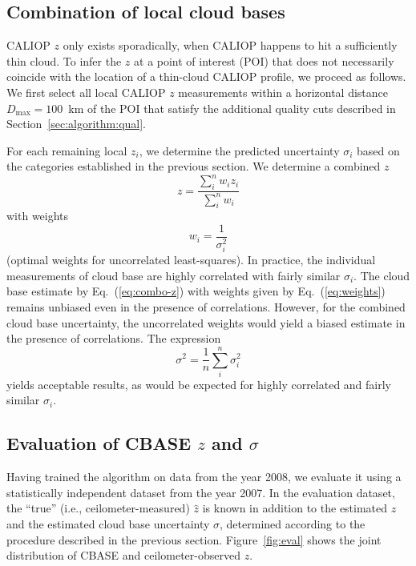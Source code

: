 \documentclass[essd,manuscript]{copernicus}\usepackage[]{graphicx}\usepackage[]{color}
\newcommand\CBH{\ensuremath{z}}
\begin{document}
\subsection{Combination of local cloud bases}
\label{sec:algorithm:combination}
CALIOP \CBH{} only exists sporadically, 
when CALIOP happens to hit a sufficiently thin cloud.  To infer the \CBH{} at a
point of interest (POI) that does not necessarily coincide with the location of
a thin-cloud CALIOP profile, we proceed as follows.  We first select all local
CALIOP \CBH{} measurements within a horizontal distance $D_\text{max} = 100$~km of
the POI that satisfy the additional quality cuts described in
Section~\ref{sec:algorithm:qual}. 

For each remaining local $\CBH{}_i$, we determine the predicted
uncertainty $\sigma_i$ based on the categories established in the previous
section.  We determine a combined \CBH{}
\begin{equation}
  \label{eq:combo-z}
  \CBH = \frac{\sum\limits_i^n w_i z_i}{\sum\limits_i^n w_i}
\end{equation}
with weights
\begin{equation}
  \label{eq:weights}
  w_i = \frac 1 {\sigma_i^2}
\end{equation}
(optimal weights for uncorrelated least-squares).  In practice, the individual
measurements of cloud base are highly correlated with fairly similar
$\sigma_i$.  The cloud base estimate by Eq.~(\ref{eq:combo-z}) with weights
given by Eq.~(\ref{eq:weights}) remains unbiased even in the presence of
correlations.  However, for the combined cloud base uncertainty,
the uncorrelated weights would yield a biased estimate in the presence of
correlations.  The expression
\begin{equation}
  \label{eq:combo-sigma}
  \sigma^2 = \frac 1 n \sum\limits_i^n \sigma_i^2
\end{equation}
yields acceptable results, as would be expected for highly correlated and fairly
similar $\sigma_i$.  

\subsection{Evaluation of CBASE \CBH{} and $\sigma$}
\label{sec:algorithm:eval}

Having trained the algorithm on data from the year 2008, we evaluate it using a
statistically independent dataset from the year 2007.  In the evaluation
dataset, the ``true'' (i.e., ceilometer-measured) $\hat{z}$ is known in
addition to the estimated \CBH{} and the estimated cloud base uncertainty $\sigma$,
determined according to the procedure described in the previous section.
Figure~\ref{fig:eval} shows the joint distribution of CBASE and
ceilometer-observed \CBH{}.  
\end{document}
